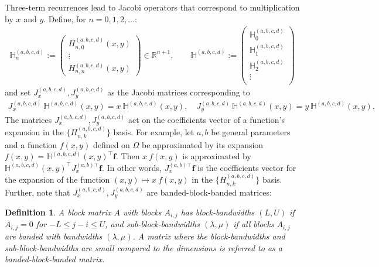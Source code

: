 \documentclass[11pt, oneside]{article}   	%
\newcommand{\R}{\mathbb{R}}
\newcommand{\hdop}{H}
\newcommand{\bighdop}{\mathbb{\hdop}}
\newcommand{\hdopnkabcd}{\hdop_{n,k}^{(a,b,c,d)}}
\newcommand{\hdopabcd}{\hdop^{(a,b,c,d)}}
\newcommand{\bighdopabcd}{\bighdop^{(a,b,c,d)}}
\newtheorem{definition}{Definition}
\begin{document}
Three-term recurrences lead to Jacobi operators that correspond to multiplication by $x$ and $y$. Define, for $n=0,1,2,\dots$: 
\begin{align*}
\bighdopabcd_n := \begin{pmatrix}
		\hdopabcd_{n,0}(x,y) \\
		\vdots \\
		\hdopabcd_{n,n}(x,y)
	\end{pmatrix} \in \R^{n+1}, 
\quad \quad 
\bighdopabcd := \begin{pmatrix}
		\bighdopabcd_0 \\
		\bighdopabcd_1 \\
		\bighdopabcd_2 \\
		\vdots \\
	\end{pmatrix}
\end{align*}
and set $J_x^{(a,b,c,d)}, J_y^{(a,b,c,d)}$ as the Jacobi matrices corresponding to
\begin{align}
J_x^{(a,b,c,d)} \: \bighdopabcd(x,y) = x \: \bighdopabcd(x,y), \quad J_y^{(a,b,c,d)} \: \bighdopabcd(x,y) = y \: \bighdopabcd(x,y).
\label{eqn:jacobimatricesdefinition}
\end{align}
The matrices $J_x^{(a,b,c,d)}, J_y^{(a,b,c,d)}$ act on the coefficients vector of a function's expansion in the $\{\hdopnkabcd\}$ basis. For example, let $a, b$ be general parameters and a function $f(x,y)$ defined on $\Omega$ be approximated by its expansion $f(x,y) = \bighdopabcd(x,y)^\top \mathbf{f}$. Then $x \: f(x,y)$ is approximated by $\bighdopabcd(x,y)^\top {J_x^{(a,b)\top}} \mathbf{f}$. In other words, ${J_x^{(a,b)\top}} \mathbf{f}$ is the coefficients vector for the expansion of the function $(x,y) \mapsto x \: f(x,y)$ in the  $\{\hdopnkabcd\}$ basis. Further, note that $J_x^{(a,b,c,d)}, J_y^{(a,b,c,d)}$ are banded-block-banded matrices:

\begin{definition}
A block matrix $A$ with blocks $A_{i,j}$ has block-bandwidths $(L,U)$ if $A_{i,j} = 0$ for $- L \leq j-i \leq U$, and sub-block-bandwidths $(\lambda, \mu)$ if all blocks $A_{i,j}$ are banded with bandwidths $(\lambda,\mu)$. A matrix where the block-bandwidths and sub-block-bandwidths are small compared to the dimensions is referred to as a banded-block-banded matrix. 
\end{definition}
\end{document}
